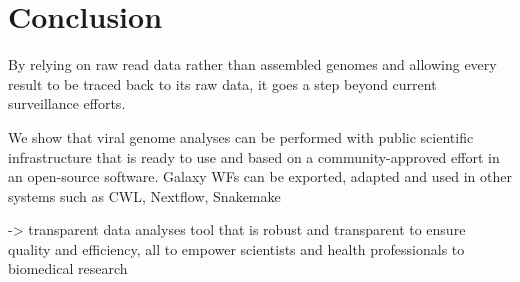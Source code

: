\chapter{Conclusion}\label{chap:conclusion}
\todoit

By relying on raw read data rather than assembled genomes and allowing every result to be traced back to its raw data, it goes a step beyond current surveillance efforts.

We show that viral genome analyses can be performed with public scientific infrastructure that is ready to use and based on a community-approved effort in an open-source software.
Galaxy WFs can be exported, adapted and used in other systems such as CWL, Nextflow, Snakemake

-> transparent data analyses tool that is robust and transparent to ensure quality and efficiency, all to empower scientists and health professionals to biomedical research